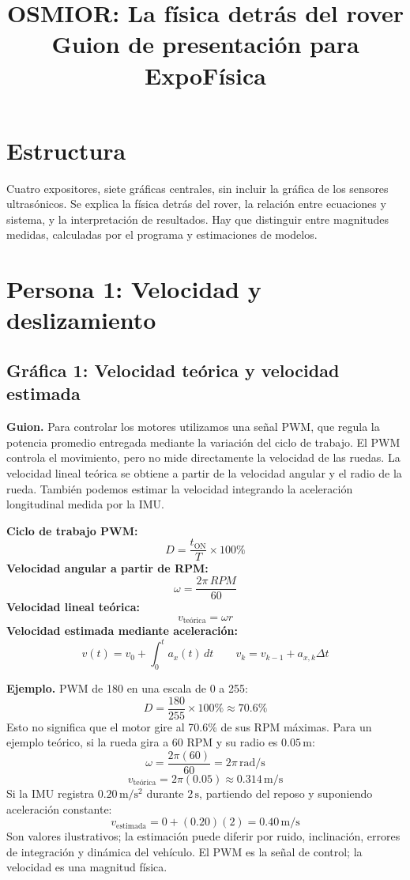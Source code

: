\documentclass[12pt,a4paper]{article}
\title{OSMIOR: La física detrás del rover\\Guion de presentación para ExpoFísica}
\author{}
\date{}
\begin{document}
\maketitle

\section*{Estructura}
Cuatro expositores, siete gráficas centrales, sin incluir la gráfica de los sensores ultrasónicos. Se explica la física detrás del rover, la relación entre ecuaciones y sistema, y la interpretación de resultados. Hay que distinguir entre magnitudes medidas, calculadas por el programa y estimaciones de modelos.

\section{Persona 1: Velocidad y deslizamiento}
\subsection{Gráfica 1: Velocidad teórica y velocidad estimada}
\textbf{Guion.} Para controlar los motores utilizamos una señal PWM, que regula la potencia promedio entregada mediante la variación del ciclo de trabajo. El PWM controla el movimiento, pero no mide directamente la velocidad de las ruedas. La velocidad lineal teórica se obtiene a partir de la velocidad angular y el radio de la rueda. También podemos estimar la velocidad integrando la aceleración longitudinal medida por la IMU.

\textbf{Ciclo de trabajo PWM:}
\[
D=\frac{t_{\mathrm{ON}}}{T}\times100\%
\]
\textbf{Velocidad angular a partir de RPM:}
\[
\omega=\frac{2\pi\,RPM}{60}
\]
\textbf{Velocidad lineal teórica:}
\[
\boxed{v_{\mathrm{teórica}}=\omega r}
\]
\textbf{Velocidad estimada mediante aceleración:}
\[
\boxed{v(t)=v_0+\int_0^t a_x(t)\,dt}
\qquad
v_k=v_{k-1}+a_{x,k}\Delta t
\]

\textbf{Ejemplo.} PWM de 180 en una escala de 0 a 255:
\[
D=\frac{180}{255}\times100\%\approx70.6\%
\]
Esto no significa que el motor gire al 70.6\% de sus RPM máximas. Para un ejemplo teórico, si la rueda gira a 60 RPM y su radio es \(0.05\,\mathrm{m}\):
\[
\omega=\frac{2\pi(60)}{60}=2\pi\,\mathrm{rad/s}
\]
\[
v_{\mathrm{teórica}}=2\pi(0.05)\approx0.314\,\mathrm{m/s}
\]
Si la IMU registra \(0.20\,\mathrm{m/s^2}\) durante \(2\,\mathrm{s}\), partiendo del reposo y suponiendo aceleración constante:
\[
v_{\mathrm{estimada}}=0+(0.20)(2)=0.40\,\mathrm{m/s}
\]
Son valores ilustrativos; la estimación puede diferir por ruido, inclinación, errores de integración y dinámica del vehículo. El PWM es la señal de control; la velocidad es una magnitud física.
\end{document}
